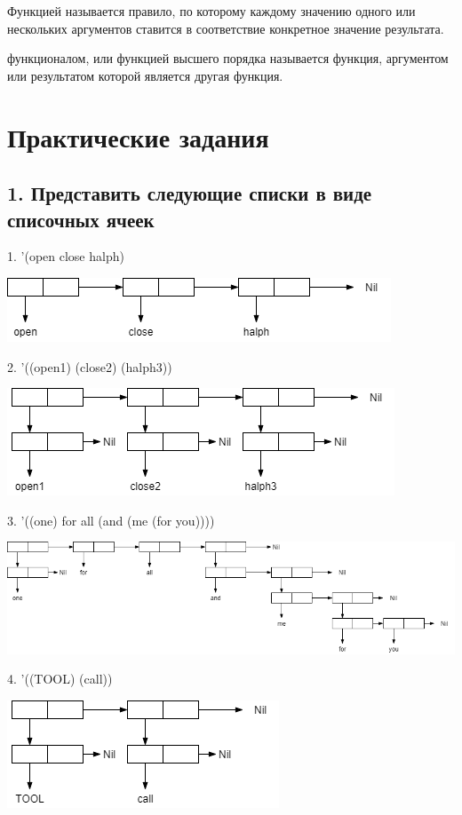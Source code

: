 \documentclass[12pt]{report}
\begin{document}
Функцией называется правило, по которому каждому значению одного или нескольких  аргументов ставится в соответствие конкретное значение результата.

функционалом, или функцией высшего порядка называется функция, аргументом или  результатом которой является другая функция.

	
\chapter*{Практические задания}	

\section*{1. Представить следующие списки в виде списочных ячеек}

1. '(open close halph)

\includegraphics[scale=1]{img/1.1}

2. '((open1) (close2) (halph3))

\includegraphics[scale=1]{img/1.2}

3. '((one) for all (and (me (for you))))

\includegraphics[scale=0.6]{img/1.3}

4. '((TOOL) (call))

\includegraphics[scale=1]{img/1.4}
\end{document}
